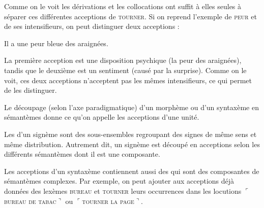 Comme on le voit les dérivations et les collocations ont suffit à elles seules à séparer ces différentes acceptions de \textsc{tourner}. Si on reprend l’exemple de \textsc{peur} et de ses intensifieurs, on peut distinguer deux acceptions :

\ea
    {Il a une peur bleue des araignées.}
\z
{}
\z
{}
\z
{}
\z

La première acception est une disposition psychique (la peur des araignées), tandis que le deuxième est un sentiment (causé par la surprise). Comme on le voit, ces deux acceptions n’acceptent pas les mêmes intensifieurs, ce qui permet de les distinguer.

Le découpage (selon l’axe paradigmatique) d’un morphème ou d’un syntaxème en sémantèmes donne ce qu’on appelle les acceptions d’une unité.

\begin{styleLivreImportant}
Les  d’un signème sont des sous-ensembles regroupant des signes de même sens et même distribution. Autrement dit, un signème est découpé en acceptions selon les différents sémantèmes dont il est une composante.
\end{styleLivreImportant}

Les acceptions d’un syntaxème contiennent aussi des  qui sont des composantes de sémantèmes complexes. Par exemple, on peut ajouter aux acceptions déjà données des lexèmes \textsc{bureau} et \textsc{tourner} leurs occurrences dans les locutions $⌜$\textsc{bureau} \textsc{de} \textsc{tabac}$⌝$ ou $⌜$\textsc{tourner} \textsc{la} \textsc{page}$⌝$.

